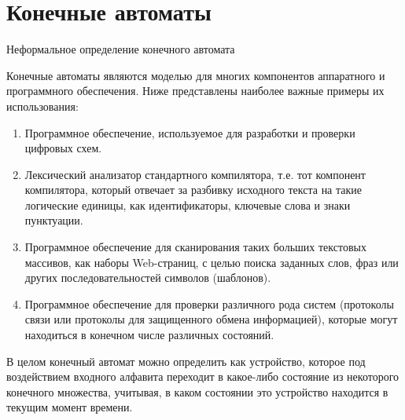 \documentclass[12pt, pdf, hyperref={unicode},handout]{beamer}
\begin{document}
\section{Конечные автоматы}

\begin{frame}{Неформальное определение конечного автомата}
  \begin{block}

    \small{
      Конечные автоматы являются моделью для многих компонентов аппаратного и программного обеспечения. Ниже представлены наиболее важные примеры их использования:
      \begin{enumerate}
\item{Программное обеспечение, используемое для разработки и проверки цифровых
схем.}
\item{Лексический анализатор стандартного компилятора, т.е. тот компонент компилятора, который отвечает за разбивку исходного текста на такие логические единицы, как идентификаторы, ключевые слова и знаки пунктуации.}
\item{Программное обеспечение для сканирования таких больших текстовых массивов, как наборы Web-страниц, с целью поиска заданных слов, фраз или других последовательностей символов (шаблонов).}
\item{Программное обеспечение для проверки различного рода систем (протоколы связи или протоколы для защищенного обмена информацией), которые могут находиться в конечном числе различных состояний.}
\end{enumerate}
В целом конечный автомат можно определить как устройство, которое под воздействием входного алфавита переходит в какое-либо состояние из некоторого конечного множества, учитывая, в каком состоянии это устройство находится в текущим момент времени.
}

  \end{block}
  
\end{frame}
\end{document}

